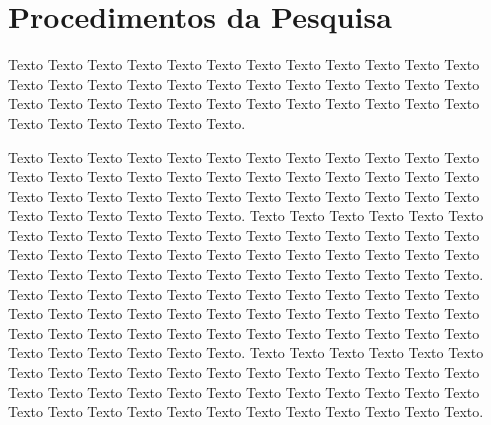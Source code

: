 \section{Procedimentos da Pesquisa}
\paragrafo{}
Texto Texto Texto Texto Texto Texto Texto Texto Texto Texto Texto Texto Texto Texto Texto Texto Texto Texto Texto Texto Texto Texto Texto Texto Texto Texto Texto Texto Texto Texto Texto Texto Texto Texto Texto Texto Texto Texto Texto Texto Texto Texto.
\begin{figure}[H]
    \begin{center}
      \label{Fig:exemplo2}
    \end{center}
\end{figure}
\paragrafo{}
Texto Texto Texto Texto Texto Texto Texto Texto Texto Texto Texto Texto Texto Texto Texto Texto Texto Texto Texto Texto Texto Texto Texto Texto Texto Texto Texto Texto Texto Texto Texto Texto Texto Texto Texto Texto Texto Texto Texto Texto Texto Texto.
\paragrafo{}
Texto Texto Texto Texto Texto Texto Texto Texto Texto Texto Texto Texto Texto Texto Texto Texto Texto Texto Texto Texto Texto Texto Texto Texto Texto Texto Texto Texto Texto Texto Texto Texto Texto Texto Texto Texto Texto Texto Texto Texto Texto Texto.
\paragrafo{}
Texto Texto Texto Texto Texto Texto Texto Texto Texto Texto Texto Texto Texto Texto Texto Texto Texto Texto Texto Texto Texto Texto Texto Texto Texto Texto Texto Texto Texto Texto Texto Texto Texto Texto Texto Texto Texto Texto Texto Texto Texto Texto.
\paragrafo{}
Texto Texto Texto Texto Texto Texto Texto Texto Texto Texto Texto Texto Texto Texto Texto Texto Texto Texto Texto Texto Texto Texto Texto Texto Texto Texto Texto Texto Texto Texto Texto Texto Texto Texto Texto Texto Texto Texto Texto Texto Texto Texto.
